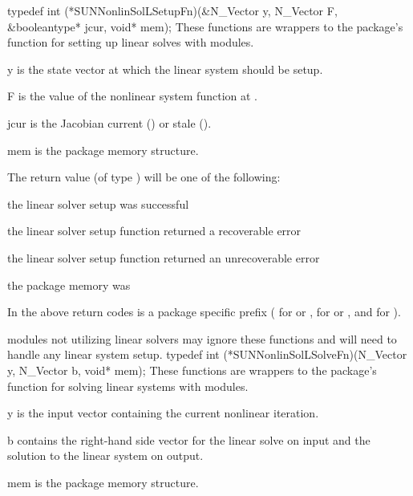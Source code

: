 {
  typedef int (*SUNNonlinSolLSetupFn)(&N\_Vector y, N\_Vector F,\\
                                      &booleantype* jcur, void* mem);
}
{
  These functions are wrappers to the {\sundials} package's function
  for setting up linear solves with {\sunlinsol} modules.
}
{
  \begin{args}[jcur]
  \item[y]
    is the state vector at which the linear system should be setup.
  \item[F]
    is the value of the nonlinear system function at .
  \item[jcur]
    is the Jacobian current () or stale ().
  \item[mem]
    is the {\sundials} package memory structure.
  \end{args}
}
{
  The return value  (of type ) will be one of the
  following:
  \begin{args}
  \item[\id{*\_SUCCESS}]
    the linear solver setup was successful
  \item[\id{*\_LSETUP\_RECVR}]
    the linear solver setup function returned a recoverable error
  \item[\id{*\_LSETUP\_FAIL}]
    the linear solver setup function returned an unrecoverable error
  \item[\id{*\_MEM\_NULL}]
    the {\sundials} package memory was 
  \end{args}
  In the above return codes \id{*} is a {\sundials} package specific
  prefix ( for {\cvode} or {\cvodes},  for {\ida} or
  {\idas}, and  for {\arkode}).
}
{
  {\sunnonlinsol} modules not utilizing {\sunlinsol} linear solvers
  may ignore these functions and will need to handle any linear system
  setup.
}
{
  typedef int (*SUNNonlinSolLSolveFn)(N\_Vector y, N\_Vector b, void* mem);
}
{
  These functions are wrappers to the {\sundials} package's function
  for solving linear systems with {\sunlinsol} modules.
}
{
  \begin{args}[mem]
  \item[y]
    is the input vector containing the current nonlinear iteration.
  \item[b]
    contains the right-hand side vector for the linear solve on input
    and the solution to the linear system on output.
  \item[mem]
    is the {\sundials} package memory structure.
  \end{args}
}
